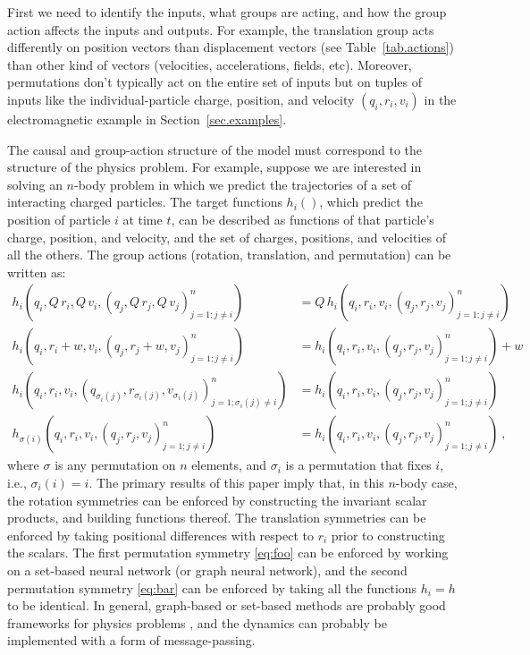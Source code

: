 \documentclass{article}
\theoremstyle{Hogg}
\begin{document}
First we need to identify the inputs, what groups are acting, and how the group action affects the inputs and outputs.
For example, the translation group acts differently on position vectors than displacement vectors (see Table~\ref{tab.actions}) than other kind of vectors (velocities, accelerations, fields, etc).
Moreover, permutations don't typically act on the entire set of inputs but on tuples of inputs like the individual-particle charge, position, and velocity $(q_i, r_i, v_i)$ in the electromagnetic example in Section~\ref{sec.examples}.

The causal and group-action structure of the model must correspond to the structure of the physics problem.
For example, suppose we are interested in solving an $n$-body problem in which we predict the trajectories of a set of interacting charged particles.
The target functions $h_i()$, which predict the position of particle $i$ at time $t$, can be described as functions of that particle's charge, position, and velocity, and the set of charges, positions, and velocities of all the others.
The group actions (rotation, translation, and permutation) can be written as:
\begin{align}
h_i( q_i, Q\,r_i, Q\,v_i, (q_j,Q\,r_j,Q\,v_j)_{j=1; j\neq i}^n)
&= Q\,h_i( q_i, r_i, v_i, (q_j,r_j,v_j)_{j=1; j\neq i}^n)
\\
h_i(q_i, r_i + w, v_i, (q_j,r_j+w,v_j)_{j=1; j\neq i}^n)
&= h_i( q_i, r_i, v_i, (q_j,r_j,v_j)_{j=1; j\neq i}^n) + w
\\
h_i(q_i, r_i , v_i, (q_{\sigma_i(j)},r_{\sigma_i(j)},v_{\sigma_i(j)})_{j=1; \sigma_i(j)\neq i}^n)
&= h_i( q_i, r_i, v_i, (q_{j},r_{j},v_{j})_{j=1; j\neq i}^n)\label{eq:foo}
\\
h_{\sigma(i)}(q_{i}, r_{i}, v_{i}, (q_{j},r_{j},v_{j})_{j=1; j\neq i}^n)
&= h_{i}( q_{i}, r_{i}, v_{i}, (q_{j},r_{j},v_{j})_{j=1; j\neq {i}}^n)\label{eq:bar}
~,
\end{align}
where $\sigma$ is any permutation on $n$ elements, and $\sigma_i$ is a permutation that fixes $i$, i.e., $\sigma_i(i)=i$.
The primary results of this paper imply that, in this $n$-body case, the rotation symmetries can be enforced by constructing the invariant scalar products, and building functions thereof.
The translation symmetries can be enforced by taking positional differences with respect to $r_i$ prior to constructing the scalars.
The first permutation symmetry \eqref{eq:foo} can be enforced by working on a set-based neural network (or graph neural network), and the second permutation symmetry \eqref{eq:bar} can be enforced by taking all the functions $h_i=h$ to be identical.
In general, graph-based or set-based methods are probably good frameworks for physics problems \cite{cranmer2020lagrangian, sanchez-gonzalez2019hamiltonian}, and the dynamics can probably be implemented with a form of message-passing.
\end{document}
